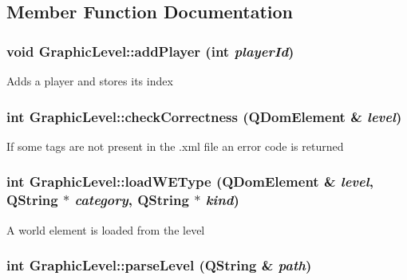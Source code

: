 \subsection{Member Function Documentation}
\hypertarget{classGraphicLevel_a38f05c45d2e3818ba737ceb4cdac11a2}{
\subsubsection[{addPlayer}]{\setlength{\rightskip}{0pt plus 5cm}void GraphicLevel::addPlayer (int {\em playerId})}}
\label{classGraphicLevel_a38f05c45d2e3818ba737ceb4cdac11a2}
Adds a player and stores its index \hypertarget{classGraphicLevel_abf207017c0a09c37c9011668b5407359}{
\subsubsection[{checkCorrectness}]{\setlength{\rightskip}{0pt plus 5cm}int GraphicLevel::checkCorrectness (QDomElement \& {\em level})}}
\label{classGraphicLevel_abf207017c0a09c37c9011668b5407359}
If some tags are not present in the .xml file an error code is returned \hypertarget{classGraphicLevel_a143b52659bfeb1bf00747ecc6b693dd7}{
\subsubsection[{loadWEType}]{\setlength{\rightskip}{0pt plus 5cm}int GraphicLevel::loadWEType (QDomElement \& {\em level}, \/  QString $\ast$ {\em category}, \/  QString $\ast$ {\em kind})}}
\label{classGraphicLevel_a143b52659bfeb1bf00747ecc6b693dd7}
A world element is loaded from the level \hypertarget{classGraphicLevel_a27843328a2fdd52b52221b4d7c28c42e}{
\subsubsection[{parseLevel}]{\setlength{\rightskip}{0pt plus 5cm}int GraphicLevel::parseLevel (QString \& {\em path})}}
\label{classGraphicLevel_a27843328a2fdd52b52221b4d7c28c42e}
